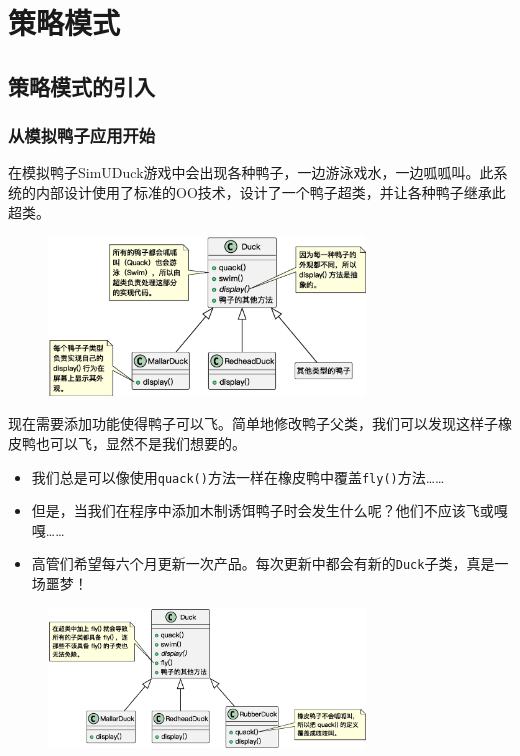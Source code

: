 \section{策略模式}

\subsection{策略模式的引入}

\subsubsection{从模拟鸭子应用开始}
在模拟鸭子SimUDuck游戏中会出现各种鸭子，一边游泳戏水，一边呱呱叫。此系统的内部设计使用了标准的OO技术，设计了一个鸭子超类，并让各种鸭子继承此超类。
\begin{figure}[H]
    \vspace{-0.5em}
	\centering
	\includegraphics[width=0.75\textwidth]{images/SimUDuck1.eps}
    \vspace{-1em}
\end{figure}

现在需要添加功能使得鸭子可以飞。简单地修改鸭子父类，我们可以发现这样子橡皮鸭也可以飞，显然不是我们想要的。
\begin{itemize}
    \item 我们总是可以像使用\;\verb|quack()|\;方法一样在橡皮鸭中覆盖\;\verb|fly()|\;方法……
    \item 但是，当我们在程序中添加木制诱饵鸭子时会发生什么呢？他们不应该飞或嘎嘎……
    \item 高管们希望每六个月更新一次产品。每次更新中都会有新的\;\verb|Duck|\;子类，真是一场噩梦！
\end{itemize}

\begin{figure}[H]
    \vspace{-0.5em}
	\centering
	\includegraphics[width=0.75\textwidth]{images/SimUDuck2.eps}
    \vspace{-1em}
\end{figure}

